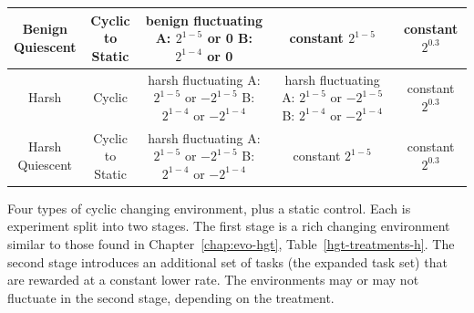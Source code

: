 \documentclass[PhD]{msu-thesis}
\begin{document}
\begin{table}[]
\begin{tabular}{|c|c||c||c|c|}
	\makecell{Benign \\ Quiescent} & \makecell{Cyclic \\ to Static} & \makecell{benign \\ fluctuating \\ A: $2^{1-5}$ or 0 \\ B: $2^{1-4}$ or 0} & \makecell{constant  \\ $2^{1-5}$} & \makecell{constant \\ $2^{0.3}$} \\\hline

	Harsh & Cyclic & \makecell{harsh \\ fluctuating \\ A: $2^{1-5}$ or $-2^{1-5}$ \\ B: $2^{1-4}$ or $-2^{1-4}$} & \makecell{harsh \\ fluctuating \\ A: $2^{1-5}$ or $-2^{1-5}$ \\ B: $2^{1-4}$ or $-2^{1-4}$} & \makecell{constant \\ $2^{0.3}$} \\\hline

	\makecell{Harsh \\ Quiescent} & \makecell{Cyclic \\ to Static} & \makecell{harsh \\ fluctuating \\ A: $2^{1-5}$ or $-2^{1-5}$ \\ B: $2^{1-4}$ or $-2^{1-4}$} & \makecell{constant  \\ $2^{1-5}$} & \makecell{constant \\ $2^{0.3}$} \\\hline
	\end{tabular} 

	\begin{flushleft} Four types of cyclic changing environment, plus a static control. Each is experiment split into two stages.
    The first stage is a rich changing environment similar to those found in Chapter~\ref{chap:evo-hgt}, Table~\ref{hgt-treatments-h}. The second stage introduces an additional set of tasks (the expanded task set) that are rewarded at a constant lower rate. The environments may or may not fluctuate in the second stage, depending on the treatment.
	\end{flushleft}
	\label{cel-treatments-complex}
	\end{table}
\end{document}
